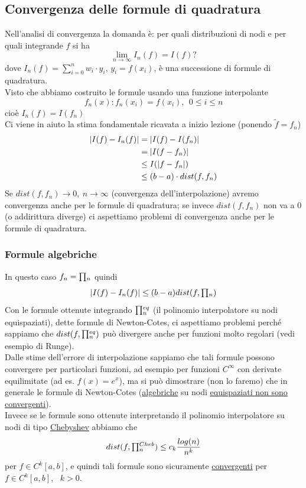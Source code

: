 \subsection{Convergenza delle formule di quadratura}
Nell'analisi di convergenza la domanda è: per quali distribuzioni di nodi e per quali integrande $f$ si ha
\[
\lim_{n \to \infty} I_n (f) = I(f) ?
\]
dove $I_n(f) = \sum_{i=0}^n w_i \cdot y_i$, $y_i = f(x_i)$, è una successione di formule di quadratura.\\
Visto che abbiamo costruito le formule usando una funzione interpolante
\[
f_n(x): f_n(x_i) = f(x_i), \ \ 0 \le i \le n
\]
cioè $I_n(f) = I(f_n)$\\
Ci viene in aiuto la stima fondamentale ricavata a inizio lezione (ponendo $\tilde{f} = f_n$)
\[
\begin{split}
\lvert I(f) - I_n(f)\rvert & = \lvert I(f) - I(f_n)\rvert \\
& = \lvert I(f - f_n)\rvert \\
& \le I(\lvert f - f_n\rvert) \\
& \le (b-a) \cdot dist(f, f_n)
\end{split}
\]
Se $dist(f, f_n) \to 0, \ n \to \infty$ (convergenza dell'interpolazione) avremo convergenza anche per le formule di quadratura; se invece $dist(f, f_n)$ non va a 0 (o addirittura diverge) ci aspettiamo problemi
di convergenza anche per le formule di quadratura.

\subsubsection{Formule algebriche}
In questo caso $f_n=\begin{matrix}\prod\end{matrix}_n$ quindi 
\begin{equation*}
    |I(f)-I_n(f)|\leq(b-a)dist(f,\begin{matrix}\prod\end{matrix}_n)
\end{equation*}
Con le formule ottenute integrando $\begin{matrix}\prod\end{matrix}_n^{eq}$ (il polinomio interpolatore su nodi equispaziati), dette formule di Newton-Cotes, ci aspettiamo problemi perché sappiamo che $dist(f,\begin{matrix}\prod\end{matrix}_n^{eq})$ può divergere anche per funzioni molto regolari (vedi esempio di Runge).\\
Dalle stime dell'errore di interpolazione sappiamo che tali formule possono convergere per particolari funzioni, ad esempio per funzioni $C^{\infty}$ con derivate equilimitate (ad es. $f(x)=e^x$), ma si può dimostrare (non lo faremo) che in generale le formule di Newton-Cotes (\uline{algebriche} su nodi \uline{equispaziati non sono convergenti}).\\ Invece se le formule sono ottenute interpretando il polinomio interpolatore su nodi di tipo \uline{Chebyshev} abbiamo che \\
\begin{equation*}
    dist(f,\begin{matrix}\prod\end{matrix}_n^{Cheb})\leq c_k\frac{log(n)}{n^k}
\end{equation*}
per $f\in C^k[a,b]$, e quindi tali formule sono sicuramente \uline{convergenti} per $f\in C^k[a,b]$, \ $k>0$.

